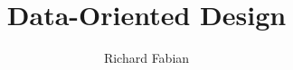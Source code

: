 \documentclass[10pt,a5paper]{book}
\begin{document}
\title{Data-Oriented Design}
\author{Richard Fabian}
\maketitle
\thispagestyle{empty}
\setcounter{tocdepth}{1}
\tableofcontents
 
\setcounter{page}{1}

%
















\end{document}
